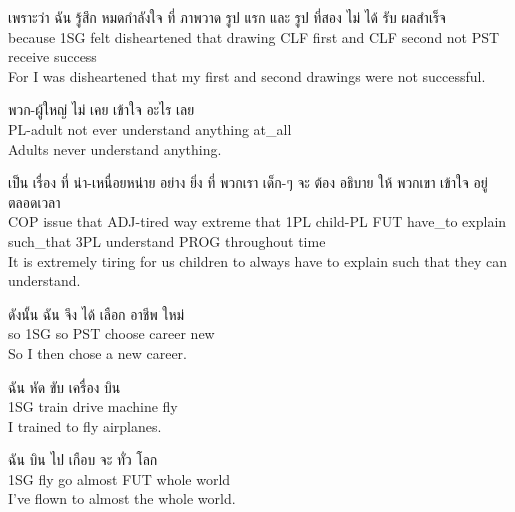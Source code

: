 \documentclass{book}
\begin{document}
	\begin{exe}
		\ex
		\gll เพราะว่า ฉัน รู้สึก หมดกำลังใจ ที่ ภาพวาด รูป แรก และ รูป ที่สอง ไม่ ได้ รับ ผลสำเร็จ\\
		because \textsc{1SG} felt disheartened that drawing \textsc{CLF} first and \textsc{CLF} second not \textsc{PST} receive success\\
		For I was disheartened that my first and second drawings were not successful.
	\end{exe}

	\begin{exe}
		\ex
		\gll พวก-ผู้ใหญ่ ไม่ เคย เข้าใจ อะไร เลย\\
		\textsc{PL}-adult not ever understand anything at\_all\\
		Adults never understand anything.
	\end{exe}

	\begin{exe}
		\ex
		\gll เป็น เรื่อง ที่ น่า-เหนื่อยหน่าย อย่าง ยิ่ง ที่ พวกเรา เด็ก-ๆ จะ ต้อง อธิบาย ให้ พวกเขา เข้าใจ อยู่ ตลอดเวลา\\
		\textsc{COP} issue that \textsc{ADJ}-tired way extreme that \textsc{1PL} child-\textsc{PL} \textsc{FUT} have\_to explain such\_that \textsc{3PL} understand \textsc{PROG} throughout time\\
		It is extremely tiring for us children to always have to explain such that they can understand.
	\end{exe}

	\begin{exe}
		\ex
		\gll ดังนั้น ฉัน จึง ได้ เลือก อาชีพ ใหม่\\
		so \textsc{1SG} so \textsc{PST} choose career new\\
		So I then chose a new career.
	\end{exe}

	\begin{exe}
		\ex
		\gll ฉัน หัด ขับ เครื่อง บิน\\
		\textsc{1SG} train drive machine fly\\
		I trained to fly airplanes.
	\end{exe}

	\begin{exe}
		\ex
		\gll ฉัน บิน ไป เกือบ จะ ทั่ว โลก\\
		\textsc{1SG} fly go almost \textsc{FUT} whole world\\
		I've flown to almost the whole world.
	\end{exe}
\end{document}

